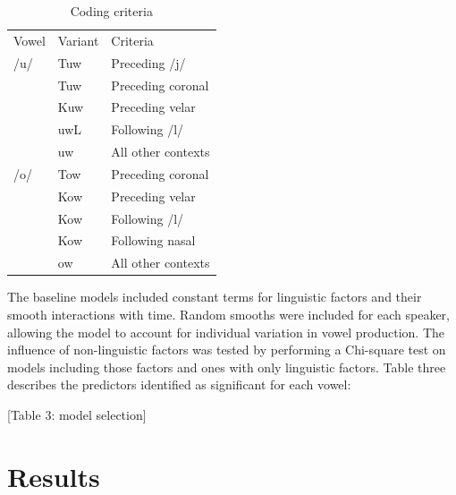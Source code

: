 \documentclass[12pt]{article}
\begin{document}
\vspace*{6pt}
\begin{table}[!htbp]
\centering
\begin{tabular}{l|l|l}
Vowel&Variant&Criteria \\
/u/&Tuw & Preceding /j/\\
&Tuw & Preceding coronal\\
&Kuw & Preceding velar\\
&uwL & Following /l/\\
&uw & All other contexts \\
/o/&Tow & Preceding coronal\\
&Kow & Preceding velar\\
&Kow & Following /l/\\
&Kow & Following nasal\\
&ow & All other contexts
\end{tabular}
\caption{Coding criteria}
\end{table}
\vspace*{6pt}

The baseline models included constant terms for linguistic factors and their smooth interactions with time. Random smooths were included for each speaker, allowing the model to account for individual variation in vowel production.
The influence of non-linguistic factors was tested by performing a Chi-square test on models including those factors and ones with only linguistic factors. Table three describes the predictors identified as significant for each vowel:

[Table 3: model selection]
\section{Results}
\end{document}
